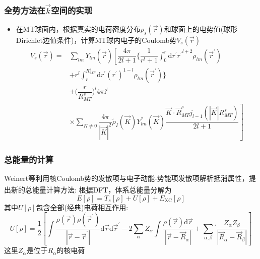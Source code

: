 \documentclass[cjk,slidestop,compress,mathserif,blue]{beamer}
\newcommand{\upcite}[1]{\hspace{0ex}\textsuperscript{\cite{#1}}} %
\begin{document}
\frame
{
	\frametitle{全势方法在$\vec k$空间的实现}
\begin{itemize}
	\item 在\textrm{MT}球面内，根据真实的电荷密度分布$\rho_s(\vec r)$和球面上的电势值(球形\textrm{Dirichlet}边值条件)，计算\textrm{MT}球内电子的\textrm{Coulomb}势$V_s(\vec r)$
		\begin{displaymath}
			\begin{aligned}
				V_s(\vec r)=&\sum_{lm}Y_{lm}(\hat{\vec r})\left[\dfrac{4\pi}{2l+1}\bigg\{\dfrac1{r^l+1}\int_0^r\mathrm{d}r^{\prime}{r^{\prime}}^{l+2}\rho_{lm}(\vec r^{\prime})\right.\\
					&+r^l\int_r^{R_{MT}^s}\mathrm{d}r^{\prime}(r^{\prime})^{1-l}\rho_{lm}(\vec r^{\prime})\bigg\}\\
					&+\bigg(\dfrac r{R_{MT}^s}\bigg)^l4\pi\mathrm{i}^l\\
					&\times\sum_{K\neq0}\left.\dfrac{4\pi}{|\vec K|^2}\tilde\rho_I(\vec K)Y_{lm}^{\ast}(\vec K)\dfrac{\vec K\cdot\vec R_{MT}^sj_{l-1}(|\vec K|R_{MT}^s)}{2l+1}\right]
			\end{aligned}
		\end{displaymath}
\end{itemize}
}

\frame
{
	\frametitle{总能量的计算}
	\textrm{Weinert}等利用核\textrm{Coulomb}势的发散项与电子动能-势能项发散项解析抵消属性，提出新的总能量计算方法\upcite{PRB26-4571_1982}:
	根据\textrm{DFT}，体系总能量分解为
	\begin{displaymath}
		E[\rho]=T_s[\rho]+U[\rho]+E_{\mathrm{XC}}[\rho]
	\end{displaymath}
	其中$U[\rho]$包含全部(经典)电荷相互作用:~
	\begin{displaymath}
		U[\rho]=\dfrac12\left[\int\dfrac{\rho(\vec r)\rho(\vec r^{\prime})}{|\vec r-\vec r^{\prime}|}\mathrm{d}\vec r\mathrm{d}\vec r^{\prime}-2\sum_{\alpha}Z_{\alpha}\int\dfrac{\rho(\vec r)\mathrm{d}\vec r}{|\vec r-\vec R_{\alpha}|}+\sum_{\alpha,\beta}{}^{\prime}\dfrac{Z_{\alpha}Z_{\beta}}{|\vec R_{\alpha}-\vec R_{\beta}|}\right]
	\end{displaymath}
	这里$Z_{\alpha}$是位于$R_{\alpha}$的核电荷
}
\end{document}
